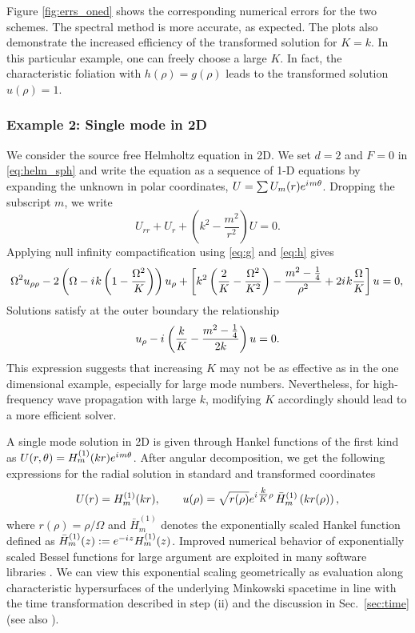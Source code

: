 \documentclass[draft,onefignum,onetabnum]{siamart190516}
\newcommand{\iu}{{i\mkern1mu}}
\begin{document}
Figure \ref{fig:errs_oned} shows the corresponding numerical errors for the two schemes. The spectral method is more accurate, as expected. The plots also demonstrate the increased efficiency of the transformed solution for $K=k$. In this particular example, one can freely choose a large $K$. In fact, the characteristic foliation with $h(\rho) =g(\rho)$ leads to the transformed solution $u(\rho)=1$. 

\subsubsection{Example 2: Single mode in 2D} 
We consider the source free Helmholtz equation in 2D. We set $d=2$ and $F=0$ in \eqref{eq:helm_sph} and write the equation as a sequence of 1-D equations by expanding the unknown in polar coordinates, $U=\sum U_m(r) e^{\iu m \theta}$. Dropping the subscript $m$, we write
\begin{equation}
	 U_{rr} + U_r + \left(k^2 - \frac{m^2}{r^2}\right)U = 0.
\end{equation}
Applying null infinity compactification using \eqref{eq:g} and \eqref{eq:h} gives 
\begin{equation}
\label{eq:hyp_2d}
	\Omega^2 u_{\rho\rho} - 2 \left(\Omega-\iu k \left(1-\frac{\Omega^2}{K}\right) \right) u_\rho + \left[k^2 \left(\frac{2}{K}-\frac{\Omega^2}{K^2}\right) - \frac{m^2-\tfrac{1}{4}}{\rho^2}  + 2 \iu k \frac{\Omega}{K} \right] u = 0,\\
\end{equation}
Solutions satisfy at the outer boundary the relationship
\[ u_\rho - \iu \left(\frac{k}{K} - \frac{m^2-\tfrac{1}{4}}{2k}\right)u = 0.  \]
This expression suggests that increasing $K$ may not be as effective as in the one dimensional example, especially for large mode numbers. Nevertheless, for high-frequency wave propagation with large $k$, modifying $K$ accordingly should lead to a more efficient solver.

A single mode solution in 2D is given through Hankel functions of the first kind as  $U(r, \theta) = H_m^{(1)}(k r) e^{\iu m \theta}$. After angular decomposition, we get the following expressions for the radial solution in standard and transformed coordinates
\begin{equation}\label{eq:hankel_soln}
	U(r) = H_m^{(1)}(k r), \qquad u(\rho) = \sqrt{r(\rho)} e^{\iu \tfrac{k}{K} \rho} \, \bar{H}_m^{(1)}\left(k r(\rho)\right),
\end{equation}
where $r(\rho)=\rho/\Omega$ and $\bar{H}_{m}^{(1)}$ denotes the exponentially scaled Hankel function defined as $\bar{H}_{m}^{(1)}(z) := e^{-\iu z} H_{m}^{(1)}(z)$. Improved numerical behavior of exponentially scaled Bessel functions for large argument are exploited in many software libraries \cite{amos1986algorithm, 2020SciPy-NMeth}. We can view this exponential scaling geometrically as evaluation along characteristic hypersurfaces of the underlying Minkowski spacetime in line with the time transformation described in step (ii) and the discussion in Sec.~\ref{sec:time} (see also \cite{ZengFramework}).
\end{document}
